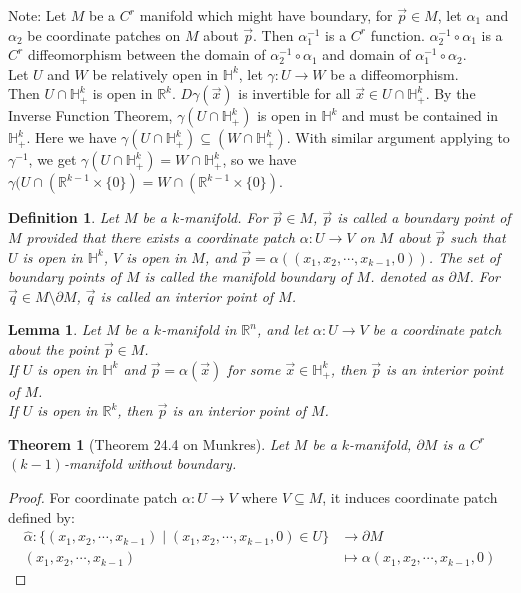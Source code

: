 \documentclass[11pt,oneside]{book}
\theoremstyle{break}
\theoremstyle{break}
\newtheorem{thm}{Theorem}[section]
\newtheorem{lem}{Lemma}[thm]
\newtheorem{defn}{Definition}[corL]
\newcommand{\R}{\mathbb{R}}
\newcommand{\note}{\color{red}Note: \color{black}}
\begin{document}
\note Let $M$ be a $C^r$ manifold which might have  boundary, for $\vec{p}\in M$, let $\alpha_1$ and $\alpha_2$ be coordinate patches on $M$ about $\vec{p}$. Then $\alpha_1^{-1}$ is a $C^r$ function. $\alpha_2^{-1}\circ \alpha_1$ is a $C^r$ diffeomorphism between the domain of $\alpha_2^{-1} \circ \alpha_1$ and domain of $\alpha_1^{-1} \circ \alpha_2$. \\

Let $U$ and $W$ be relatively open in $\mathbb{H}^k$, let $\gamma:U \to W$ be a diffeomorphism.\\ 
Then $U \cap \mathbb{H}_+^k$ is open in $\R^k$. $D\gamma(\vec{x})$ is invertible for all $\vec{x}\in U\cap \mathbb{H}_+^k$. By the Inverse Function Theorem, $\gamma(U\cap \mathbb{H}_+^k)$ is open in $\mathbb{H}^k$ and must be contained in $\mathbb{H}_+^k$. Here we have $\gamma(U\cap \mathbb{H}_+^k) \subseteq (W \cap \mathbb{H}_+^k)$. With similar argument applying to $\gamma^{-1}$, we get $\gamma(U \cap \mathbb{H}_+^k) = W \cap \mathbb{H}_+^k$, so we have $\gamma(U\cap (\R^{k-1} \times \{0\}) = W\cap (\R^{k-1} \times \{0\})$. 


\begin{defn}
Let $M$ be a $k$-manifold. For $\vec{p}\in M$, $\vec{p}$ is called a boundary point of $M$ provided that there exists a coordinate patch $\alpha:U \to V$ on $M$ about $\vec{p}$ such that $U$ is open in $\mathbb{H}^k$, $V$ is open in $M$, and $\vec{p} = \alpha((x_1,x_2,\cdots, x_{k-1},0))$. The set of boundary points of $M$ is called the manifold boundary of $M$. denoted as $\partial M$. For $\vec{q}\in M\setminus \partial M$, $\vec{q}$ is called an interior point of $M$. 
\end{defn}

\begin{lem}
Let $M$ be a $k$-manifold in $\R^n$, and let $\alpha:U \to V$ be a coordinate patch about the point $\vec{p}\in M$. \\If $U$ is open in $\mathbb{H}^k$ and $\vec{p} = \alpha(\vec{x})$ for some $\vec{x}\in \mathbb{H}_+^k$, then $\vec{p}$ is an interior point of $M$.
\\If $U$ is open in $\R^k$, then $\vec{p}$ is an interior point of $M$. 
\end{lem}


\begin{thm}[Theorem 24.4 on Munkres]
Let $M$ be a $k$-manifold, $\partial M$ is a $C^r$ $(k-1)$-manifold without boundary.
\end{thm}
\begin{proof}
For coordinate patch $\alpha:U \to V$ where $V \subseteq M$, it induces coordinate patch defined by: 
\begin{align*}
\hat{\alpha}: \{(x_1,x_2,\cdots, x_{k-1})\mid (x_1,x_2,\cdots, x_{k-1},0) \in U\}&\to \partial M \\ (x_1,x_2,\cdots, x_{k-1})&\mapsto \alpha(x_1,x_2,\cdots, x_{k-1},0)
\end{align*}
\end{proof}
\end{document}
